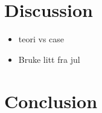 \documentclass{article}
\begin{document}
\section{Discussion}
\begin{itemize}
\item teori vs case
\item Bruke litt fra jul
\end{itemize}
\section{Conclusion}
\end{document}
